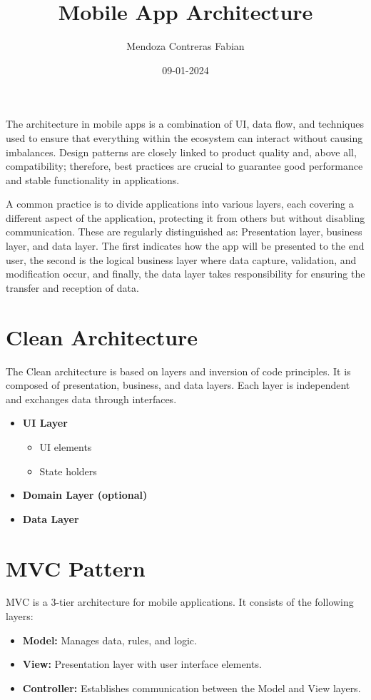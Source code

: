 \documentclass{article}
\title{Mobile App Architecture}
\author{Mendoza Contreras Fabian}
\date{09-01-2024}
\begin{document}
	
	\maketitle
	
	The architecture in mobile apps is a combination of UI, data flow, and techniques used to ensure that everything within the ecosystem can interact without causing imbalances. Design patterns are closely linked to product quality and, above all, compatibility; therefore, best practices are crucial to guarantee good performance and stable functionality in applications.
	
	A common practice is to divide applications into various layers, each covering a different aspect of the application, protecting it from others but without disabling communication. These are regularly distinguished as: Presentation layer, business layer, and data layer. The first indicates how the app will be presented to the end user, the second is the logical business layer where data capture, validation, and modification occur, and finally, the data layer takes responsibility for ensuring the transfer and reception of data.
	
	\section*{Clean Architecture}
	The Clean architecture is based on layers and inversion of code principles. It is composed of presentation, business, and data layers. Each layer is independent and exchanges data through interfaces.
	\begin{itemize}
		\item \textbf{UI Layer}
		\begin{itemize}
			\item UI elements
			\item State holders
		\end{itemize}
		\item \textbf{Domain Layer (optional)}
		\item \textbf{Data Layer}
	\end{itemize}
	
	\section*{MVC Pattern}
	MVC is a 3-tier architecture for mobile applications. It consists of the following layers:
	\begin{itemize}
		\item \textbf{Model:} Manages data, rules, and logic.
		\item \textbf{View:} Presentation layer with user interface elements.
		\item \textbf{Controller:} Establishes communication between the Model and View layers.
	\end{itemize}
	
\end{document}
